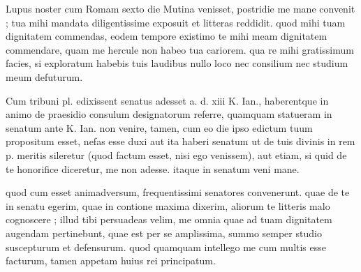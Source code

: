 


 Lupus noster cum Romam sexto die Mutina venisset, postridie me mane convenit ; tua mihi mandata diligentissime exposuit et litteras reddidit. quod mihi tuam dignitatem commendas, eodem tempore existimo te mihi meam dignitatem commendare, quam me hercule non habeo tua cariorem. qua re mihi gratissimum facies, si exploratum habebis tuis laudibus nullo loco nec consilium nec studium meum defuturum.

 Cum tribuni pl. edixissent senatus adesset a. d. xiii K. Ian., haberentque in animo de praesidio consulum designatorum referre, quamquam statueram in senatum ante K. Ian. non venire, tamen, cum eo die ipso edictum tuum propositum esset, nefas esse duxi aut ita haberi senatum ut de tuis divinis in rem p. meritis sileretur (quod factum esset, nisi ego venissem), aut etiam, si quid de te honorifice diceretur, me non adesse. itaque in senatum veni mane.

 quod cum esset animadversum, frequentissimi senatores convenerunt. quae de te in senatu egerim, quae in contione maxima dixerim, aliorum te litteris malo cognoscere ; illud tibi persuadeas velim, me omnia quae ad tuam dignitatem augendam pertinebunt, quae est per se amplissima, summo semper studio suscepturum et defensurum. quod quamquam intellego me cum multis esse facturum, tamen appetam huius rei principatum.
